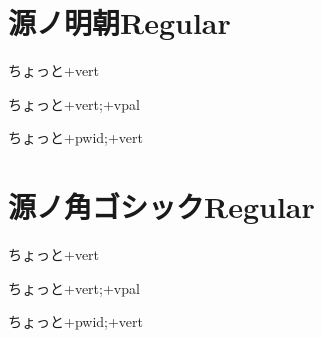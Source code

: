 \documentclass[tate,paper={297mm,210mm}]{jlreq}
\begin{document}
\section*{源ノ明朝Regular}

\sernone\hbox{\tate\vrule ちょっと\vrule +vert}

\servpal\hbox{\tate\vrule ちょっと\vrule +vert;+vpal}

\serpwidvert\hbox{\tate\vrule ちょっと\vrule +pwid;+vert}

\section*{源ノ角ゴシックRegular}

\sarnone\hbox{\tate\vrule ちょっと\vrule +vert}

\sarvpal\hbox{\tate\vrule ちょっと\vrule +vert;+vpal}

\sarpwidvert\hbox{\tate\vrule ちょっと\vrule +pwid;+vert}
\end{document}
